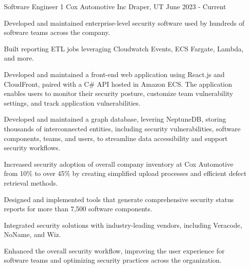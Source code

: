 


\begin{cventries}


\cventry
{Software Engineer 1} %
{Cox Automotive Inc} %
{Draper, UT} %
{June 2023 - Current} %
{ %
\begin{cvitems}
\item {Developed and maintained enterprise-level security software used by hundreds of software teams across the company.}
\item {Built reporting ETL jobs leveraging Cloudwatch Events, ECS Fargate, Lambda, and more.}
\item {Developed and maintained a front-end web application using React.js and CloudFront, paired with a C\# API hosted in Amazon ECS. The application enables users to monitor their security posture, customize team vulnerability settings, and track application vulnerabilities.}
\item {Developed and maintained a graph database, levering NeptuneDB, storing thousands of interconnected entities, including security vulnerabilities, software components, teams, and users, to streamline data accessibility and support security workflows.}
\item {Increased security adoption of overall company inventory at Cox Automotive from 10\% to over 45\% by creating simplified upload processes and efficient defect retrieval methods.}
\item {Designed and implemented tools that generate comprehensive security status reports for more than 7,500 software components.}
\item {Integrated security solutions with industry-leading vendors, including Veracode, NoName, and Wiz.}
\item {Enhanced the overall security workflow, improving the user experience for software teams and optimizing security practices across the organization.}
\end{cvitems}
}


\end{cventries}
